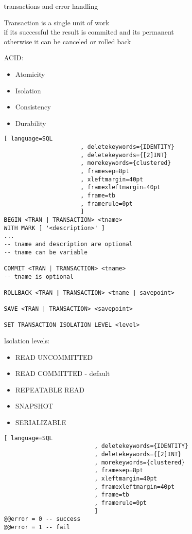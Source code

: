 \documentclass{article}
\begin{document}
    \begin{section}{transactions and error handling}

    Transaction is a single unit of work \\
    if its successful the result is commited and its permanent \\
    otherwise it can be canceled or rolled back

    ACID:
    \begin{itemize}
        \item Atomicity
        \item Isolation
        \item Consistency
        \item Durability
    \end{itemize}

    \begin{lstlisting}[ language=SQL
                      , deletekeywords={IDENTITY}
                      , deletekeywords={[2]INT}
                      , morekeywords={clustered}
                      , framesep=8pt
                      , xleftmargin=40pt
                      , framexleftmargin=40pt
                      , frame=tb
                      , framerule=0pt 
                      ]
BEGIN <TRAN | TRANSACTION> <tname>
WITH MARK [ '<description>' ]
...
-- tname and description are optional
-- tname can be variable

COMMIT <TRAN | TRANSACTION> <tname>
-- tname is optional

ROLLBACK <TRAN | TRANSACTION> <tname | savepoint>

SAVE <TRAN | TRANSACTION> <savepoint>

SET TRANSACTION ISOLATION LEVEL <level>
    \end{lstlisting}

        Isolation levels:
        \begin{itemize}
            \item READ UNCOMMITTED
            \item READ COMMITTED - default
            \item REPEATABLE READ
            \item SNAPSHOT
            \item SERIALIZABLE
        \end{itemize}

        
        \begin{lstlisting}[ language=SQL
                          , deletekeywords={IDENTITY}
                          , deletekeywords={[2]INT}
                          , morekeywords={clustered}
                          , framesep=8pt
                          , xleftmargin=40pt
                          , framexleftmargin=40pt
                          , frame=tb
                          , framerule=0pt 
                          ]
@@error = 0 -- success
@@error = 1 -- fail


\end{lstlisting}
\end{section}
\end{document}
